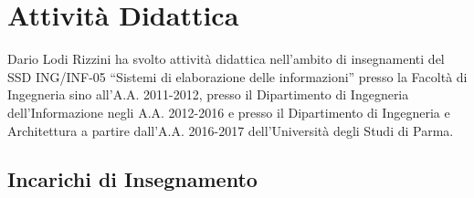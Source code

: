 \documentclass[11pt]{article}
\newcommand{\ITEMDATE}[1]{\item \textit{#1:}\\}
\begin{document}



\section{Attivit\`a Didattica}

Dario Lodi Rizzini ha svolto attivit\`a didattica nell'ambito di insegnamenti del 
SSD ING/INF-05 ``Sistemi di elaborazione delle informazioni'' presso la Facolt\`a di Ingegneria 
sino all'A.A. 2011-2012, presso il Dipartimento di Ingegneria dell'Informazione negli A.A. 2012-2016 
e presso il Dipartimento di Ingegneria e Architettura a partire dall'A.A. 2016-2017
dell'Universit\`a degli Studi di Parma. 

\subsection*{Incarichi di Insegnamento}
\end{document}
